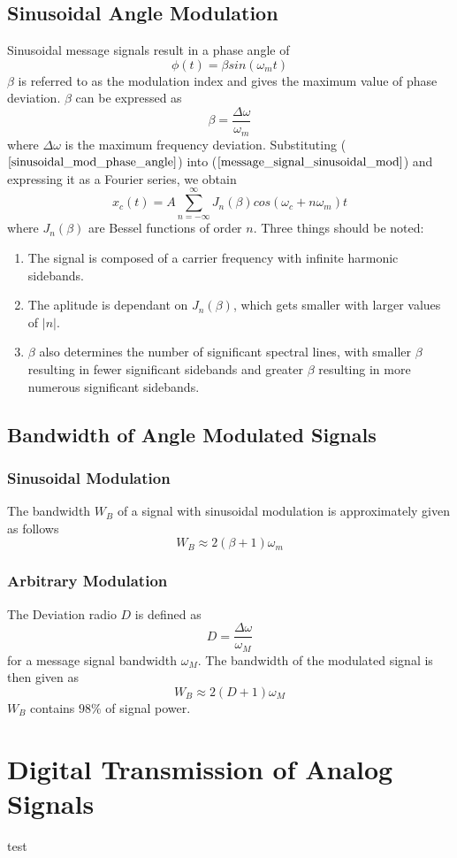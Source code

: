 \documentclass[]{article}
\begin{document}
\subsection{Sinusoidal Angle Modulation}
Sinusoidal message signals result in a phase angle of
\begin{equation} \phi(t) = \beta sin(\omega_{m}t) \label{sinusoidal_mod_phase_angle}\end{equation}
$\beta$ is referred to as the modulation index and gives the maximum value of phase deviation. $\beta$ can be expressed as 
\begin{equation} \beta = \frac{\Delta \omega}{\omega_{m}} \end{equation}
where $\Delta \omega$ is the maximum frequency deviation. Substituting ($\ref{sinusoidal_mod_phase_angle}$) into ($\ref{message_signal_sinusoidal_mod}$) and expressing it as a Fourier series, we obtain
\begin{equation} x_{c}(t) = A \sum_{n=-\infty}^{\infty} J_{n}(\beta)cos(\omega_{c}+n\omega_{m})t \end{equation}
where $J_{n}(\beta)$ are Bessel functions of order $n$. Three things should be noted:
\begin{enumerate}
	\item The signal is composed of a carrier frequency with infinite harmonic sidebands.
	\item The aplitude is dependant on $J_{n}(\beta)$, which gets smaller with larger values of $|n|$.
	\item $\beta$ also determines the number of significant spectral lines, with smaller $\beta$ resulting in fewer significant sidebands and greater $\beta$ resulting in more numerous significant sidebands.
\end{enumerate}
\subsection{Bandwidth of Angle Modulated Signals}
\subsubsection{Sinusoidal Modulation}
The bandwidth $W_{B}$ of a signal with sinusoidal modulation is approximately given as follows
\begin{equation} W_{B} \approx 2(\beta + 1)\omega_{m} \end{equation}
\subsubsection{Arbitrary Modulation}
The Deviation radio $D$ is defined as
\begin{equation} D = \frac{\Delta \omega}{\omega_{M}} \end{equation}
for a message signal bandwidth $\omega_{M}$. The bandwidth of the modulated signal is then given as
\begin{equation} W_{B} \approx 2(D +1)\omega_{M} \end{equation}
$W_{B}$ contains $98\%$ of signal power.
\section{Digital Transmission of Analog Signals}
test



\end{document}
